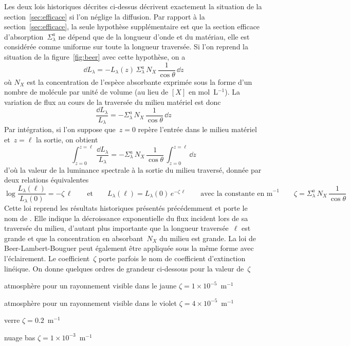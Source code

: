 \sk
Les deux lois historiques décrites ci-dessus décrivent exactement la situation de la section~\ref{sec:efficace} si l'on néglige la diffusion. Par rapport à la section~\ref{sec:efficace}, la seule hypothèse supplémentaire est que la section efficace d'absorption~$\Sigma_\lambda^a$ ne dépend que de la longueur d'onde et du matériau, elle est considérée comme uniforme sur toute la longueur traversée. Si l'on reprend la situation de la figure~\ref{fig:beer} avec cette hypothèse, on a 
\[ \dd L_\lambda = - L_\lambda(z) \, \Sigma_\lambda^a \, N_X \, \frac{1}{\cos\theta} \, \dd z \]
où $N_X$ est la concentration de l'espèce absorbante exprimée sous la forme d'un nombre de molécule par unité de volume (au lieu de $[X]$ en mol~L$^{-1}$).
La variation de flux au cours de la traversée du milieu matériel est donc
\[ \frac{\dd L_\lambda}{L_\lambda} = - \Sigma_\lambda^a \, N_X \, \frac{1}{\cos\theta} \, \dd z \]
Par intégration, si l'on suppose que~$z=0$ repère l'entrée dans le milieu matériel et~$z=\ell$ la sortie, on obtient
\[ \int_{z=0}^{z=\ell} \, \frac{\dd L_\lambda}{L_\lambda} = - \Sigma_\lambda^a \, N_X \, \frac{1}{\cos\theta} \, \int_{z=0}^{z=\ell} \dd z \]
d'où la valeur de la luminance spectrale à la sortie du milieu traversé, donnée par deux relations équivalentes
\[ \boxed{ \log \frac{L_\lambda(\ell)}{L_\lambda(0)} = - \zeta \, \ell } \qquad \textrm{et} \qquad \boxed{ L_\lambda(\ell) = L_\lambda(0) \, e^{- \zeta \, \ell} } \qquad \textrm{avec la constante en m}^{-1} \qquad \zeta = \Sigma_\lambda^a \, N_X \, \frac{1}{\cos\theta} \]
Cette loi reprend les résultats historiques présentés précédemment et porte le nom de . Elle indique la décroissance exponentielle du flux incident lors de sa traversée du milieu, d'autant plus importante que la longueur traversée~$\ell$ est grande et que la concentration en absorbant~$N_X$ du milieu est grande. La loi de Beer-Lambert-Bouguer peut également être appliquée sous la même forme avec l'éclairement. Le coefficient~$\zeta$ porte parfois le nom de coefficient d'extinction linéique. 
On donne quelques ordres de grandeur ci-dessous pour la valeur de~$\zeta$
\begin{citemize}
\item atmosphère pour un rayonnement visible dans le jaune $\zeta = 1 \times 10^{-5}$~m$^{-1}$ 
\item atmosphère pour un rayonnement visible dans le violet $\zeta = 4 \times 10^{-5}$~m$^{-1}$
\item verre $\zeta = 0.2$~m$^{-1}$
\item nuage bas $\zeta = 1 \times 10^{-3}$~m$^{-1}$
\end{citemize}
